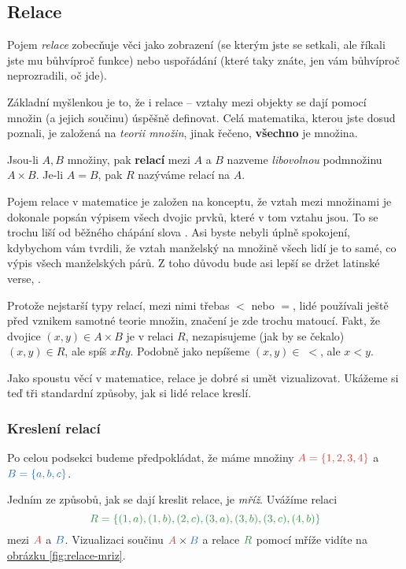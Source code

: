 \subsection{Relace}
\label{ssec:relace}

Pojem \emph{relace} zobecňuje věci jako zobrazení (se kterým jste se setkali,
ale říkali jste mu bůhvíproč funkce) nebo uspořádání (které taky znáte, jen vám
bůhvíproč neprozradili, oč jde).

Základní myšlenkou je to, že i relace -- vztahy mezi objekty se dají pomocí
množin (a jejich součinu) úspěšně definovat. Celá matematika, kterou jste dosud
poznali, je založená na \emph{teorii množin}, jinak řečeno, \textbf{všechno} je
množina.

\begin{definition}[Relace]
 Jsou-li $A,B$ množiny, pak \textbf{relací} mezi $A$ a $B$ nazveme
 \emph{libovolnou} podmnožinu $A \times B$. Je-li $A = B$, pak $R$ nazýváme
 relací na $A$.
\end{definition}

Pojem relace v matematice je založen na konceptu, že vztah mezi množinami je
dokonale popsán výpisem všech dvojic prvků, které v tom vztahu jsou. To se
trochu liší od běžného chápání slova . Asi byste nebyli úplně
spokojení, kdybychom vám tvrdili, že vztah manželský na množině všech lidí je to
samé, co výpis všech manželských párů. Z toho důvodu bude asi lepší se držet
latinské verse, .

Protože nejstarší typy relací, mezi nimi třebas $<$ nebo $=$, lidé používali
ještě před vznikem samotné teorie množin, značení je zde trochu matoucí. Fakt,
že dvojice $(x,y) \in A \times B$ je v relaci $R$, nezapisujeme (jak by se
čekalo) $(x,y) \in R$, ale spíš $xRy$. Podobně jako nepíšeme $(x,y) \in \; <$,
ale $x < y$.

Jako spoustu věcí v matematice, relace je dobré si umět vizualizovat. Ukážeme si
teď tři standardní způsoby, jak si lidé relace kreslí.

\subsubsection{Kreslení relací}
\label{sssec:kresleni-relaci}

Po celou podsekci budeme předpokládat, že máme množiny $\clr{A = \{1, 2, 3,
4\}}$ a $\clb{B = \{a, b, c\}}$.

Jedním ze způsobů, jak se dají kreslit relace, je \emph{mříž}. Uvážíme relaci
\[
 \clg{R = \{(1, a), (1, b), (2, c), (3, a), (3, b), (3, c), (4, b)\}}
\]
mezi $\clr{A}$ a $\clb{B}$. Vizualizaci součinu $\clr{A} \times \clb{B}$ a
relace $\clg{R}$ pomocí mříže vidíte na \hyperref[fig:relace-mriz]{obrázku
\ref*{fig:relace-mriz}}.

